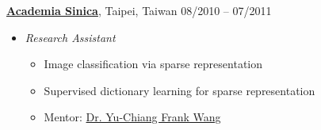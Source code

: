 \documentclass[10pt]{article}
\newenvironment{innerlist}[1][\enskip\textbullet]%
        {\begin{itemize}[#1,leftmargin=*,parsep=0pt,itemsep=0pt,topsep=0pt,partopsep=0pt]}
        {\end{itemize}}
\begin{document}
\vspace{.1in}
\href{http://www.sinica.edu.tw}{\textbf{Academia Sinica}}, Taipei, Taiwan \hfill {08/2010 -- 07/2011} \\
\vspace{-.15in}
\begin{innerlist}
\item[] \emph{Research Assistant} \\
    \vspace{-.15in}
    \begin{innerlist}
    \item Image classification via sparse representation
    \item Supervised dictionary learning for sparse representation
    \item Mentor: \href{http://www.citi.sinica.edu.tw/pages/ycwang/}{Dr. Yu-Chiang Frank Wang}
    \end{innerlist}
\end{innerlist}
\end{document}

